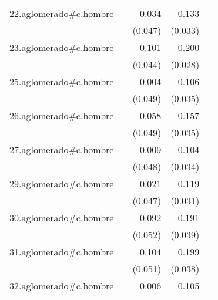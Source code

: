 {\begin{longtable}{l*{4}{D{.}{.}{-1}}}
\addlinespace
22.aglomerado#c.hombre&                     &       0.034         &       0.133\sym{***}&                     \\
            &                     &     (0.047)         &     (0.033)         &                     \\
\addlinespace
23.aglomerado#c.hombre&                     &       0.101\sym{*}  &       0.200\sym{***}&                     \\
            &                     &     (0.044)         &     (0.028)         &                     \\
\addlinespace
25.aglomerado#c.hombre&                     &       0.004         &       0.106\sym{**} &                     \\
            &                     &     (0.049)         &     (0.035)         &                     \\
\addlinespace
26.aglomerado#c.hombre&                     &       0.058         &       0.157\sym{***}&                     \\
            &                     &     (0.049)         &     (0.035)         &                     \\
\addlinespace
27.aglomerado#c.hombre&                     &       0.009         &       0.104\sym{**} &                     \\
            &                     &     (0.048)         &     (0.034)         &                     \\
\addlinespace
29.aglomerado#c.hombre&                     &       0.021         &       0.119\sym{***}&                     \\
            &                     &     (0.047)         &     (0.031)         &                     \\
\addlinespace
30.aglomerado#c.hombre&                     &       0.092         &       0.191\sym{***}&                     \\
            &                     &     (0.052)         &     (0.039)         &                     \\
\addlinespace
31.aglomerado#c.hombre&                     &       0.104\sym{*}  &       0.199\sym{***}&                     \\
            &                     &     (0.051)         &     (0.038)         &                     \\
\addlinespace
32.aglomerado#c.hombre&                     &       0.006         &       0.105\sym{***}&                     \\

\end{longtable}}
